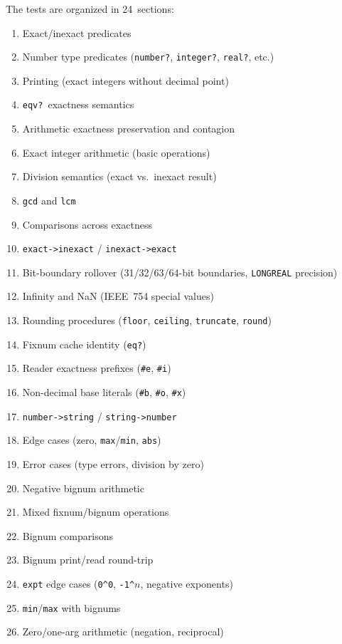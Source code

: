 \documentclass[12pt]{article}
\begin{document}
\noindent The tests are organized in 24~sections:

\begin{enumerate}[nosep]
\item Exact/inexact predicates
\item Number type predicates ({\tt number?}, {\tt integer?}, {\tt real?}, etc.)
\item Printing (exact integers without decimal point)
\item {\tt eqv?}\ exactness semantics
\item Arithmetic exactness preservation and contagion
\item Exact integer arithmetic (basic operations)
\item Division semantics (exact vs.\ inexact result)
\item {\tt gcd} and {\tt lcm}
\item Comparisons across exactness
\item {\tt exact->inexact} / {\tt inexact->exact}
\item Bit-boundary rollover (31/32/63/64-bit boundaries, {\tt LONGREAL} precision)
\item Infinity and NaN (IEEE~754 special values)
\item Rounding procedures ({\tt floor}, {\tt ceiling}, {\tt truncate}, {\tt round})
\item Fixnum cache identity ({\tt eq?})
\item Reader exactness prefixes ({\tt \#e}, {\tt \#i})
\item Non-decimal base literals ({\tt \#b}, {\tt \#o}, {\tt \#x})
\item {\tt number->string} / {\tt string->number}
\item Edge cases (zero, {\tt max}/{\tt min}, {\tt abs})
\item Error cases (type errors, division by zero)
\item Negative bignum arithmetic
\item Mixed fixnum/bignum operations
\item Bignum comparisons
\item Bignum print/read round-trip
\item {\tt expt} edge cases ({\tt 0\^{}0}, {\tt -1\^{}$n$}, negative exponents)
\item {\tt min}/{\tt max} with bignums
\item Zero/one-arg arithmetic (negation, reciprocal)
\end{enumerate}
\end{document}

